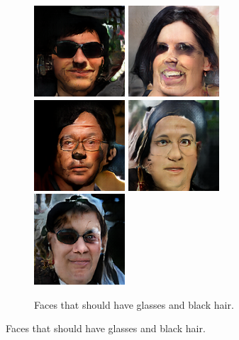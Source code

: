 \begin{figure}[!h]
\begin{subfigure}[b]{\textwidth}
{            \includegraphics[scale=0.485]{figures/ffhq/forced-glasses-hair-black/ffhq128x128_glasses_yes_hair_color_black0001.png}
            \includegraphics[scale=0.485]{figures/ffhq/forced-glasses-hair-black/ffhq128x128_glasses_yes_hair_color_black0002.png}
            \includegraphics[scale=0.485]{figures/ffhq/forced-glasses-hair-black/ffhq128x128_glasses_yes_hair_color_black0003.png}
            \includegraphics[scale=0.485]{figures/ffhq/forced-glasses-hair-black/ffhq128x128_glasses_yes_hair_color_black0004.png}
            \includegraphics[scale=0.485]{figures/ffhq/forced-glasses-hair-black/ffhq128x128_glasses_yes_hair_color_black0005.png}
        }
        \caption{Faces that should have glasses and black hair.}
        \vspace{0.1cm}

\end{subfigure}
\end{figure}
